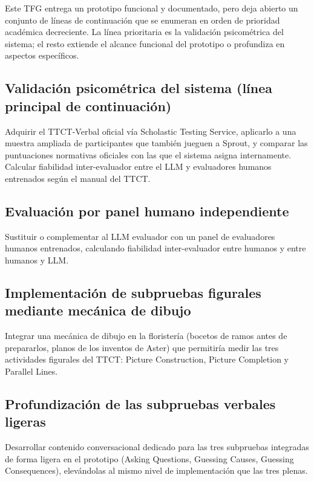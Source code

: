 \documentclass[12pt,twoside,titlepage]{report}
\begin{document}
Este TFG entrega un prototipo funcional y documentado, pero deja abierto un conjunto de líneas de continuación que se enumeran en orden de prioridad académica decreciente. La línea prioritaria es la validación psicométrica del sistema; el resto extiende el alcance funcional del prototipo o profundiza en aspectos específicos.

\subsection{Validación psicométrica del sistema (línea principal de continuación)}

Adquirir el TTCT-Verbal oficial vía Scholastic Testing Service, aplicarlo a una muestra ampliada de participantes que también jueguen a Sprout, y comparar las puntuaciones normativas oficiales con las que el sistema asigna internamente. Calcular fiabilidad inter-evaluador entre el LLM y evaluadores humanos entrenados según el manual del TTCT.

\subsection{Evaluación por panel humano independiente}

Sustituir o complementar al LLM evaluador con un panel de evaluadores humanos entrenados, calculando fiabilidad inter-evaluador entre humanos y entre humanos y LLM.

\subsection{Implementación de subpruebas figurales mediante mecánica de dibujo}

Integrar una mecánica de dibujo en la floristería (bocetos de ramos antes de prepararlos, planos de los inventos de Aster) que permitiría medir las tres actividades figurales del TTCT: Picture Construction, Picture Completion y Parallel Lines.

\subsection{Profundización de las subpruebas verbales ligeras}

Desarrollar contenido conversacional dedicado para las tres subpruebas integradas de forma ligera en el prototipo (Asking Questions, Guessing Causes, Guessing Consequences), elevándolas al mismo nivel de implementación que las tres plenas.
\end{document}
